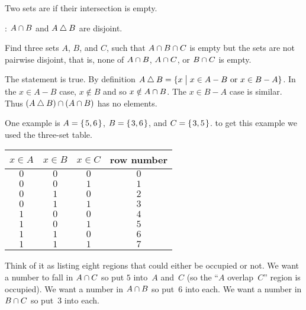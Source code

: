 \documentclass{ibl}  %
\begin{document}
\begin{df}
Two sets are  if their intersection is empty.  
\end{df}

\begin{ex}
\begin{exes}
\item \pord: $A\cap B$ and $A\mathbin{\triangle} B$ are disjoint.  
\item Find three sets $A$, $B$, and $C$, such that 
$A\cap B\cap C$ is empty but the sets are
not pairwise disjoint, that is, none of $A\cap B$, 
$A\cap C$, or $B\cap C$ is empty. 
\end{exes}
\begin{ans}
\begin{exes}
\item The statement is true.
  By definition $A\mathbin{\triangle} B=\{x \bigm| \text{$x\in A-B$ or $x\in B-A$}\}$.
  In the $x\in A-B$ case, $x\notin B$ and so $x\notin A\cap B$.
  The $x\in B-A$ case is similar.
  Thus $(A\mathbin{\triangle} B)\cap (A\cap B)$ has no elements.
\item One example is $A=\mbox{$\{\hspace{0.1em}5,6\hspace{0.1em}\}$}$, $B=\mbox{$\{\hspace{0.1em}3,6\hspace{0.1em}\}$}$, and 
  $C=\mbox{$\{\hspace{0.1em}3,5\hspace{0.1em}\}$}$.
  \remark
  to get this example we used the three-set table.
  \begin{center} \small
    \begin{tabular}{ccc|c}
      $x\in A$  &$x\in B$  &$x\in C$  &row number \\ \hline
         $0$    &$0$       &$0$       &$0$    \\
         $0$    &$0$       &$1$       &$1$    \\
         $0$    &$1$       &$0$       &$2$    \\
         $0$    &$1$       &$1$       &$3$    \\[.5ex]
         $1$    &$0$       &$0$       &$4$    \\
         $1$    &$0$       &$1$       &$5$    \\
         $1$    &$1$       &$0$       &$6$    \\
         $1$    &$1$       &$1$       &$7$    
    \end{tabular}
  \end{center}
  Think of it as listing eight regions that could either be occupied or not.
  We want a number to fall in $A\cap C$ so put
  $5$ into~$A$ and~$C$ (so the ``$A$ overlap~$C$'' region is occupied).
  We want a number in $A\cap B$ so put~$6$ into each.
  We want a number in $B\cap C$ so put~$3$ into each.
\end{exes}
\end{ans}
\end{ex}
\end{document}
